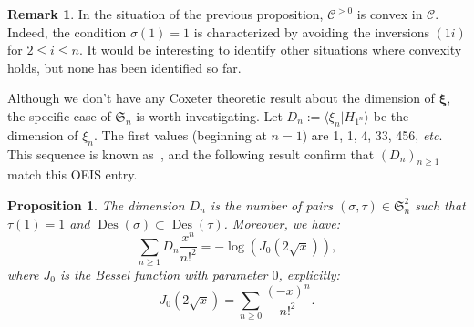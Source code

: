 \documentclass[11pt]{article}
\newtheorem{prop}[theo]{Proposition}
\theoremstyle{definition}
\newtheorem{rema}[theo]{Remark}
\DeclareMathOperator{\des}{Des}
\newcommand{\bxi}{\boldsymbol{\xi}}
\newcommand{\CC}{\mathcal{C}}
\newcommand{\CCP}{\mathcal{C}^{>0}}
\begin{document}
\begin{rema}
    In the situation of the previous proposition, $\CCP$ is convex in $\CC$.  Indeed, the condition $\sigma(1)=1$ is characterized by avoiding the inversions $(1i)$ for $2\leq i \leq n$.  It would be interesting to identify other situations where convexity holds, but none has been identified so far.
\end{rema}

Although we don't have any Coxeter theoretic result about the dimension of $\bxi$, the specific case of $\mathfrak{S}_n$ is worth investigating.   Let $D_n := \langle \xi_n | H_{1^n} \rangle$ be the dimension of $\xi_n$.  The first values (beginning at $n=1$) are 1, 1, 4, 33, 456, {\it etc}.  This sequence is known as~\cite[A002190]{oeis}, and the following result confirm that $(D_n)_{n\geq 1}$ match this OEIS entry.

\begin{prop} \label{prop:Sn}
    The dimension $D_n$ is the number of pairs $(\sigma,\tau) \in \mathfrak{S}_n^2$ such that $\tau(1)=1$ and $\des(\sigma) \subset \des(\tau)$.
    Moreover, we have:
    \begin{equation} \label{eq:gend_n}
        \sum_{n\geq 1} D_n \frac{x^n}{n!^2} = -\log(J_0(2\sqrt{x})),
    \end{equation}
    where $J_0$ is the {\it Bessel function} with parameter $0$, explicitly:    
    \[
        J_0(2\sqrt{x}) = \sum_{n\geq 0} \frac{(-x)^n}{n!^2}.
    \]
\end{prop}
\end{document}
